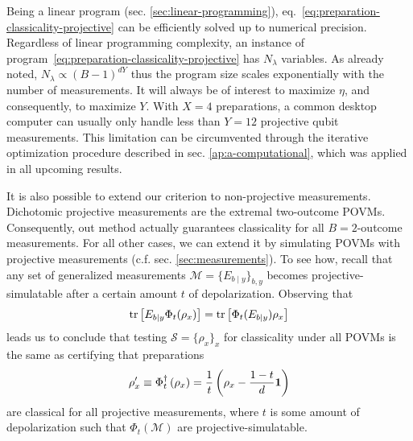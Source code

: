         Being a linear program (sec. \ref{sec:linear-programming}), eq.~\ref{eq:preparation-classicality-projective} can be efficiently solved up to numerical precision. Regardless of linear programming complexity, an instance of program~\eqref{eq:preparation-classicality-projective} has $N_\lambda$ variables. As already noted, $N_\lambda \propto (B-1)^{dY}$ thus the program size scales exponentially with the number of measurements. It will always be of interest to maximize $\eta$, and consequently, to maximize $Y$. With $X=4$ preparations, a common desktop computer can usually only handle less than $Y = 12$ projective qubit measurements. This limitation can be circumvented through the iterative optimization procedure described in sec. \ref{ap:a-computational}, which was applied in all upcoming results.

        It is also possible to extend our criterion to non-projective measurements. Dichotomic projective measurements are the extremal two-outcome POVMs. Consequently, out method actually guarantees classicality for all $B=2$-outcome measurements. For all other cases, we can extend it by simulating POVMs with projective measurements (c.f. sec. \ref{sec:measurements}). To see how, recall that any set of generalized measurements $\mathcal{M} = \{ E_{b \mid y} \}_{b,y}$ becomes projective-simulatable after a certain amount $t$ of depolarization. Observing that
        \begin{equation}
            \text{tr}\left[ E_{b \mid y} \Phi_t(\rho_x) \right] = \text{tr}\left[ \Phi_t(E_{b \mid y}) \rho_x \right]
        \end{equation}
        leads us to conclude that testing $\mathcal{S} = \{ \rho_x \}_x$ for classicality under all POVMs is the same as certifying that preparations
        \begin{equation}
            \rho^\prime_x \equiv \Phi_t^\dagger \left( \rho_x \right) = \frac{1}{t} \left( \rho_x - \frac{1-t}{d} \mathbf{1} \right)
        \end{equation}
        are classical for all projective measurements, where $t$ is some amount of depolarization such that $\Phi_t(\mathcal{M})$ are projective-simulatable.

